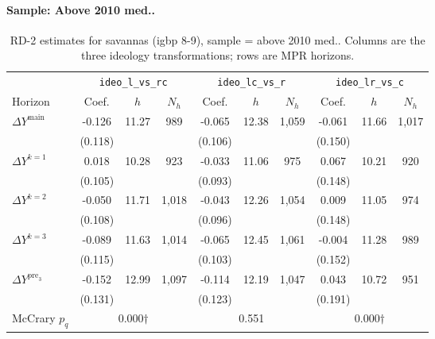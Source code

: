 \documentclass[11pt]{article}
\begin{document}
\paragraph{Sample: Above 2010 med..}
\begin{table}[H]
\centering
\scriptsize
\caption{RD-2 estimates for savannas (igbp 8-9), sample = above 2010 med..
Columns are the three ideology transformations; rows are MPR horizons.}
\label{tab:rd2_savannas_above}
\begin{tabular}{l ccc ccc ccc}
\toprule
 & \multicolumn{3}{c}{\texttt{ideo\_l\_vs\_rc}}
 & \multicolumn{3}{c}{\texttt{ideo\_lc\_vs\_r}}
 & \multicolumn{3}{c}{\texttt{ideo\_lr\_vs\_c}} \\
\cmidrule(lr){2-4} \cmidrule(lr){5-7} \cmidrule(lr){8-10}
Horizon & Coef. & $h$ & $N_h$ & Coef. & $h$ & $N_h$ & Coef. & $h$ & $N_h$ \\
\midrule
$\Delta Y^{\text{main}}$ & -0.126 & 11.27 & 989 & -0.065 & 12.38 & 1,059 & -0.061 & 11.66 & 1,017 \\
 & (0.118) &  &  & (0.106) &  &  & (0.150) &  &  \\
\addlinespace[1pt]
$\Delta Y^{k=1}$ & 0.018 & 10.28 & 923 & -0.033 & 11.06 & 975 & 0.067 & 10.21 & 920 \\
 & (0.105) &  &  & (0.093) &  &  & (0.148) &  &  \\
\addlinespace[1pt]
$\Delta Y^{k=2}$ & -0.050 & 11.71 & 1,018 & -0.043 & 12.26 & 1,054 & 0.009 & 11.05 & 974 \\
 & (0.108) &  &  & (0.096) &  &  & (0.148) &  &  \\
\addlinespace[1pt]
$\Delta Y^{k=3}$ & -0.089 & 11.63 & 1,014 & -0.065 & 12.45 & 1,061 & -0.004 & 11.28 & 989 \\
 & (0.115) &  &  & (0.103) &  &  & (0.152) &  &  \\
\addlinespace[1pt]
$\Delta Y^{\text{pre}_3}$ & -0.152 & 12.99 & 1,097 & -0.114 & 12.19 & 1,047 & 0.043 & 10.72 & 951 \\
 & (0.131) &  &  & (0.123) &  &  & (0.191) &  &  \\
\addlinespace[1pt]
\midrule
McCrary $p_q$ & \multicolumn{3}{c}{0.000$\dagger$} & \multicolumn{3}{c}{0.551} & \multicolumn{3}{c}{0.000$\dagger$} \\
\bottomrule
\end{tabular}
\end{table}
\end{document}
